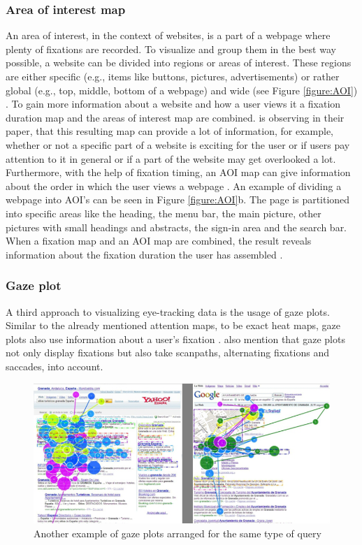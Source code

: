 \subsubsection{Area of interest map}
An area of interest, in the context of websites, is a part of a webpage where plenty of fixations are recorded. To visualize and group them in the best way possible, a website can be divided into regions or areas of interest. These regions are either specific (e.g., items like buttons, pictures, advertisements) or rather global (e.g., top, middle, bottom of a webpage) and wide (see Figure \ref{figure:AOI}) \autocite[]{gonzalez2011different, djamasbi2014eye}. To gain more information about a website and how a user views it a fixation duration map and the areas of interest map are combined.
\textcite{djamasbi2014eye} is observing in their paper, that this resulting map can provide a lot of information, for example, whether or not a specific part of a website is exciting for the user or if users pay attention to it in general or if a part of the website may get overlooked a lot. Furthermore, with the help of fixation timing, an AOI map can give information about the order in which the user views a webpage \autocite[]{djamasbi2014eye}.
An example of dividing a webpage into AOI's can be seen in Figure \ref{figure:AOI}b. The page is partitioned into specific areas like the heading, the menu bar, the main picture, other pictures with small headings and abstracts, the sign-in area and the search bar. When a fixation map and an AOI map are combined, the result reveals information about the fixation duration the user has assembled \autocite{djamasbi2014eye}.

\subsubsection{Gaze plot}
A third approach to visualizing eye-tracking data is the usage of gaze plots. Similar to the already mentioned attention maps, to be exact heat maps, gaze plots also use information about a user's fixation \autocite[]{kurzhals2016gaze}. \textcite[]{kurzhals2016gaze} also mention that gaze plots not only display fixations but also take scanpaths, alternating fixations and saccades, into account. 

\begin{figure}[!ht]
    \centering
    \includegraphics[width=1\linewidth]{images/GazePlot_gonzalez2011different.png}
    \caption{
       Another example of gaze plots arranged for the same type of query \autocite[12]{gonzalez2011different}
    }
    \label{figure:GazePlot}
\end{figure}

